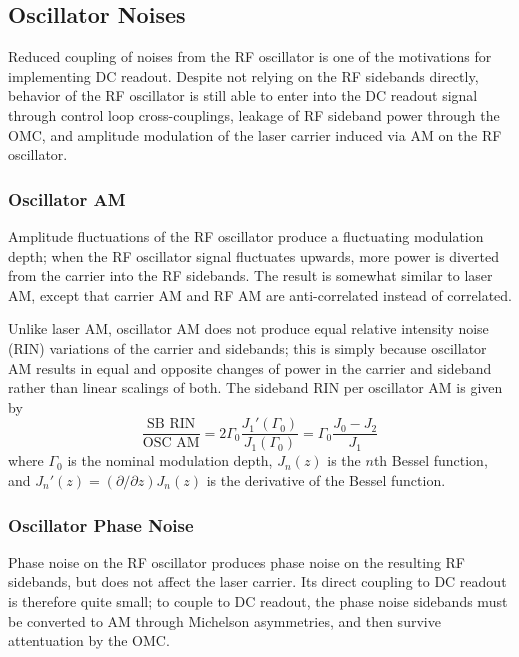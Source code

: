 \subsection{Oscillator Noises}

Reduced coupling of noises from the RF oscillator is one of the
motivations for implementing DC readout. Despite not relying on the RF
sidebands directly, behavior of the RF oscillator is still able to
enter into the DC readout signal through control loop cross-couplings,
leakage of RF sideband power through the OMC, and amplitude modulation
of the laser carrier induced via AM on the RF oscillator.

\subsubsection{Oscillator AM}

Amplitude fluctuations of the RF oscillator produce a fluctuating modulation
depth; when the RF oscillator signal fluctuates upwards, more power is diverted
from the carrier into the RF sidebands.  The result is somewhat similar to laser
AM, except that carrier AM and RF AM are anti-correlated instead of correlated.

Unlike laser AM, oscillator AM does not produce equal relative intensity noise
(RIN) variations of the carrier and sidebands; this is simply because oscillator
AM results in equal and opposite changes of power in the carrier and sideband
rather than linear scalings of both.  The sideband RIN per oscillator AM is
given by
\begin{equation}
\frac{\text{SB RIN}}{\text{OSC AM}}=2\Gamma_{0}\frac{J_{1}'(\Gamma_{0})}{J_{1}(\Gamma_{0})}=\Gamma_{0}\frac{J_{0}-J_{2}}{J_{1}}
\end{equation}
where $\Gamma_0$ is the nominal modulation depth, $J_n(z)$ is the $n$th Bessel
function, and $J_n'(z)=(\partial/\partial z)J_n(z)$ is the derivative of the Bessel function.

\subsubsection{Oscillator Phase Noise}

Phase noise on the RF oscillator produces phase noise on the resulting
RF sidebands, but does not affect the laser carrier.  Its direct
coupling to DC readout is therefore quite small; to couple to DC
readout, the phase noise sidebands must be converted to AM through
Michelson asymmetries, and then survive attentuation by the OMC.

